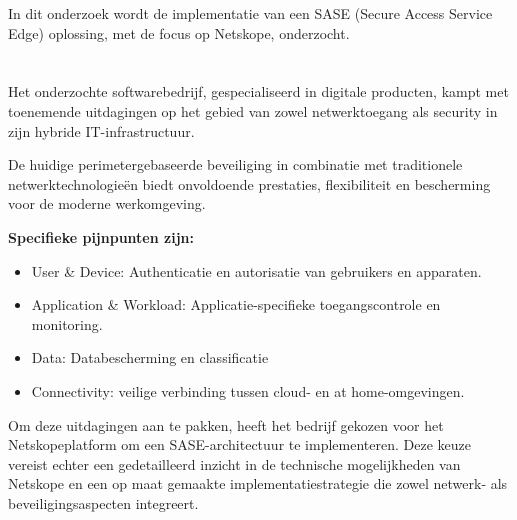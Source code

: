 In dit onderzoek wordt de implementatie van een SASE (Secure Access Service Edge) oplossing, met de focus op Netskope, onderzocht.
\section{}%
\label{sec:probleemstelling}


Het onderzochte softwarebedrijf, gespecialiseerd in digitale producten, kampt met toenemende uitdagingen op het gebied van zowel netwerktoegang als security in zijn hybride IT-infrastructuur. 

\vspace{2ex}

De huidige perimetergebaseerde beveiliging in combinatie met traditionele netwerktechnologieën biedt onvoldoende prestaties, flexibiliteit en bescherming voor de moderne werkomgeving.

\vspace{2ex}

\textbf{Specifieke pijnpunten zijn:}

\begin{itemize}
  \item User \& Device: Authenticatie en autorisatie van gebruikers en apparaten.
	\item Application \& Workload: Applicatie-specifieke toegangscontrole en monitoring.
  \item Data: Databescherming en classificatie
  \item Connectivity: veilige verbinding tussen cloud- en at home-omgevingen.
\end{itemize}

Om deze uitdagingen aan te pakken, heeft het bedrijf gekozen voor het Netskopeplatform om een SASE-architectuur te implementeren. Deze keuze vereist echter een gedetailleerd inzicht in de technische mogelijkheden van Netskope en een op maat gemaakte implementatiestrategie die zowel netwerk- als beveiligingsaspecten integreert.


